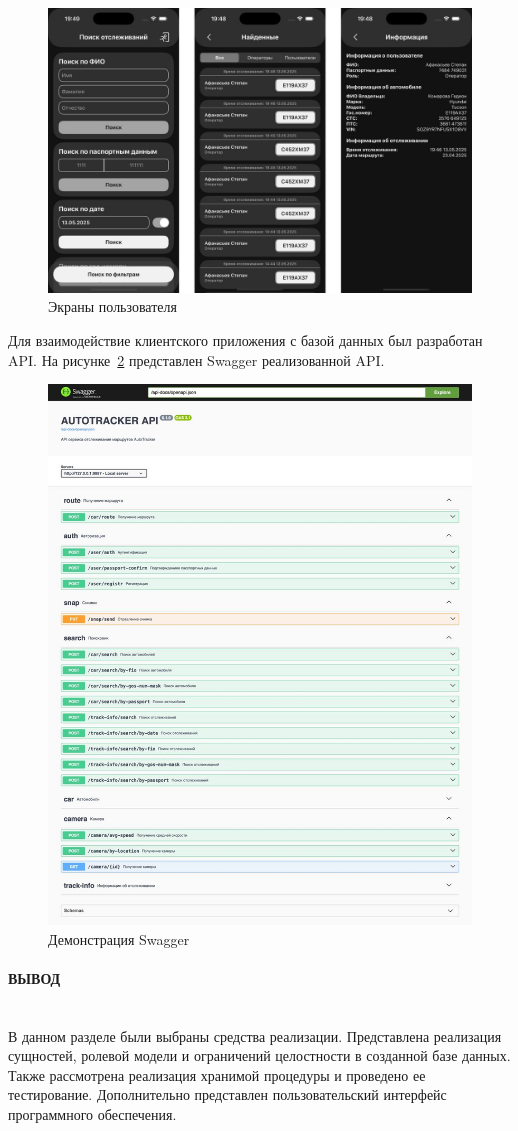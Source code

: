 \begin{figure}[H]
    \centering
    \includegraphics[width=0.8\linewidth]{images/interface/audit.png}
    \caption{Экраны пользователя}
    \label{fig:int:audit}
\end{figure}

Для взаимодействие клиентского приложения с базой данных был разработан API. На рисунке~\ref{fig:int:swagger} представлен Swagger реализованной API.

\begin{figure}[H]
    \centering
    \includegraphics[width=0.8\linewidth]{images/interface/swagger.png}
    \caption{Демонстрация Swagger}
    \label{fig:int:swagger}
\end{figure}

\paragraph*{ВЫВОД} ${}$ \\

В данном разделе были выбраны средства реализации. Представлена реализация сущностей, ролевой модели и ограничений целостности в созданной базе данных. Также рассмотрена реализация хранимой процедуры и проведено ее тестирование. Дополнительно представлен пользовательский интерфейс программного обеспечения.
